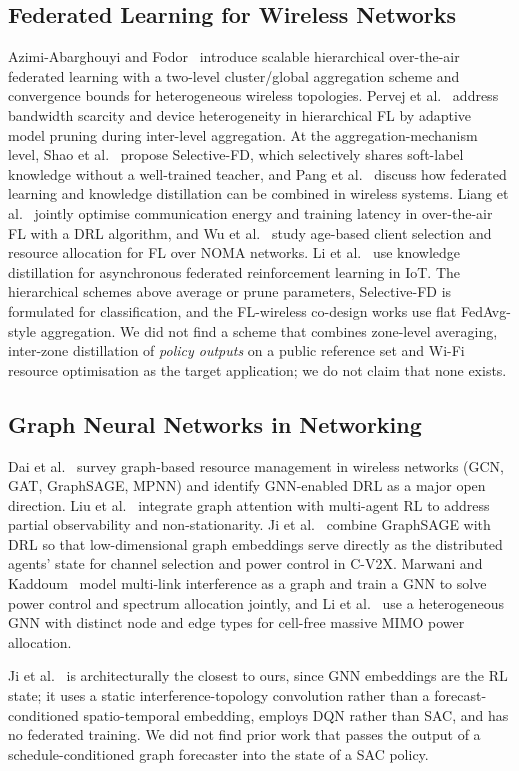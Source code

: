 \subsection{Federated Learning for Wireless Networks}
Azimi-Abarghouyi and Fodor~\cite{azimi2024} introduce scalable hierarchical over-the-air federated learning with a two-level cluster/global aggregation scheme and convergence bounds for heterogeneous wireless topologies. Pervej et al.~\cite{pervej2024} address bandwidth scarcity and device heterogeneity in hierarchical FL by adaptive model pruning during inter-level aggregation. At the aggregation-mechanism level, Shao et al.~\cite{shao2024} propose Selective-FD, which selectively shares soft-label knowledge without a well-trained teacher, and Pang et al.~\cite{pang2024} discuss how federated learning and knowledge distillation can be combined in wireless systems. Liang et al.~\cite{liang2025} jointly optimise communication energy and training latency in over-the-air FL with a DRL algorithm, and Wu et al.~\cite{wu2024} study age-based client selection and resource allocation for FL over NOMA networks. Li et al.~\cite{li2025kd} use knowledge distillation for asynchronous federated reinforcement learning in IoT. The hierarchical schemes above average or prune parameters, Selective-FD is formulated for classification, and the FL-wireless co-design works use flat FedAvg-style aggregation. We did not find a scheme that combines zone-level averaging, inter-zone distillation of \emph{policy outputs} on a public reference set and Wi-Fi resource optimisation as the target application; we do not claim that none exists.

\subsection{Graph Neural Networks in Networking}
Dai et al.~\cite{dai2024} survey graph-based resource management in wireless networks (GCN, GAT, GraphSAGE, MPNN) and identify GNN-enabled DRL as a major open direction. Liu et al.~\cite{liu2024gnn} integrate graph attention with multi-agent RL to address partial observability and non-stationarity. Ji et al.~\cite{ji2024} combine GraphSAGE with DRL so that low-dimensional graph embeddings serve directly as the distributed agents' state for channel selection and power control in C-V2X. Marwani and Kaddoum~\cite{marwani2024} model multi-link interference as a graph and train a GNN to solve power control and spectrum allocation jointly, and Li et al.~\cite{li2024hetgnn} use a heterogeneous GNN with distinct node and edge types for cell-free massive MIMO power allocation.

Ji et al.~\cite{ji2024} is architecturally the closest to ours, since GNN embeddings are the RL state; it uses a static interference-topology convolution rather than a forecast-conditioned spatio-temporal embedding, employs DQN rather than SAC, and has no federated training. We did not find prior work that passes the output of a schedule-conditioned graph forecaster into the state of a SAC policy.
